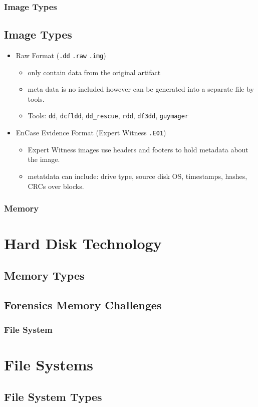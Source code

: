 \documentclass{beamer}
\begin{document}
\begin{frame}
	\frametitle{Image Types}
	\subsection{Image Types}
	\begin{itemize}
		\item Raw Format (\texttt{.dd} \texttt{.raw} \texttt{.img})
		\begin{itemize}
			\item only contain data from the original artifact
			\item meta data is no included however can be generated into a separate file by tools.
			\item Tools: \texttt{dd}, \texttt{dcfldd}, \texttt{dd\_rescue}, \texttt{rdd}, \texttt{df3dd}, \texttt{guymager}
		\end{itemize}
		\item EnCase Evidence Format (Expert Witness \texttt{.E01})
		\begin{itemize}
			\item Expert Witness images use headers and footers to hold metadata about the image.
			\item metatdata can include: drive type, source disk OS, timestamps, hashes, CRCs over blocks.
		\end{itemize}
	\end{itemize}
\end{frame}

\begin{frame}
	\frametitle{Memory}
	\section{Hard Disk Technology}
		\subsection{Memory Types} %
		\subsection{Forensics Memory Challenges}
\end{frame}

\begin{frame}
	\frametitle{File System}
	\section{File Systems}
		\subsection{File System Types} %
\end{frame}
\end{document}
